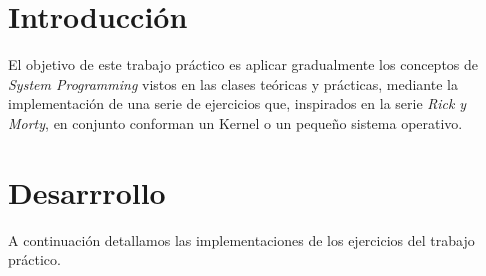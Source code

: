 \documentclass[a4paper]{article}
\begin{document}
\thispagestyle{empty}

\maketitle


\thispagestyle{empty}
\vfill


\thispagestyle{empty}
\vspace{3cm}
\tableofcontents
\newpage


\newpage

\section{Introducción}
\justify
El objetivo de este trabajo práctico es aplicar gradualmente los conceptos de \textit{System Programming} vistos en las clases teóricas y prácticas, mediante la implementación de una serie de ejercicios que, inspirados en la serie \textit{Rick y Morty}, en conjunto conforman un Kernel o un pequeño sistema operativo.  



\section{Desarrrollo}
\justify
A continuación detallamos las implementaciones de los ejercicios del trabajo práctico.
\end{document}
